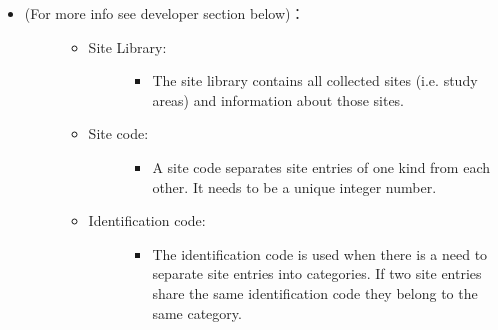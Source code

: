 \documentclass[letterpaper,10pt,english]{sphinxmanual}
\begin{document}
\begin{itemize}
\begin{description}
\begin{itemize}
\end{itemize}

\end{description}

\item {} \begin{description}
\item[{ (For more info see developer section below)：}] \leavevmode\begin{itemize}
\item {} \begin{description}
\item[{Site Library:}] \leavevmode\begin{itemize}
\item {} 
The site library contains all collected sites (i.e. study areas) and information about those sites.

\end{itemize}

\end{description}

\item {} \begin{description}
\item[{Site code:}] \leavevmode\begin{itemize}
\item {} 
A site code separates site entries of one kind from each other. It needs to be a unique integer number.

\end{itemize}

\end{description}

\item {} \begin{description}
\item[{Identification code:}] \leavevmode\begin{itemize}
\item {} 
The identification code is used when there is a need to separate site entries into categories. If two site entries share the same identification code they belong to the same category.

\end{itemize}

\end{description}

\end{itemize}

\end{description}


\end{itemize}
\end{document}
